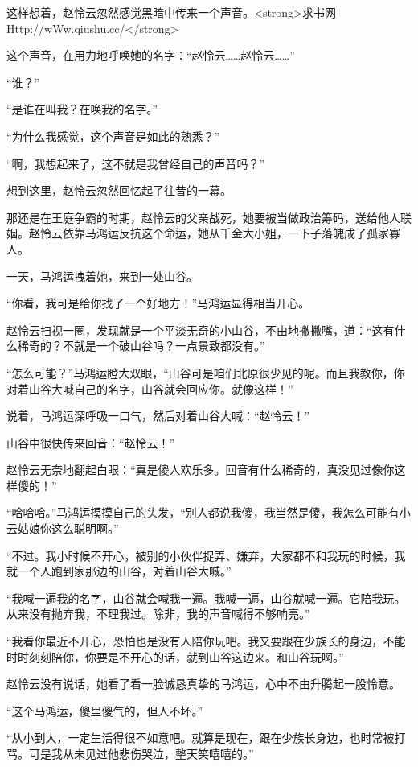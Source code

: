 
\begin{this_body}

这样想着，赵怜云忽然感觉黑暗中传来一个声音。<strong>求书网Http://wWw.qiushu.cc/</strong>

这个声音，在用力地呼唤她的名字：“赵怜云……赵怜云……”

“谁？”

“是谁在叫我？在唤我的名字。”

“为什么我感觉，这个声音是如此的熟悉？”

“啊，我想起来了，这不就是我曾经自己的声音吗？”

想到这里，赵怜云忽然回忆起了往昔的一幕。

那还是在王庭争霸的时期，赵怜云的父亲战死，她要被当做政治筹码，送给他人联姻。赵怜云依靠马鸿运反抗这个命运，她从千金大小姐，一下子落魄成了孤家寡人。

一天，马鸿运拽着她，来到一处山谷。

“你看，我可是给你找了一个好地方！”马鸿运显得相当开心。

赵怜云扫视一圈，发现就是一个平淡无奇的小山谷，不由地撇撇嘴，道：“这有什么稀奇的？不就是一个破山谷吗？一点景致都没有。”

“怎么可能？”马鸿运瞪大双眼，“山谷可是咱们北原很少见的呢。而且我教你，你对着山谷大喊自己的名字，山谷就会回应你。就像这样！”

说着，马鸿运深呼吸一口气，然后对着山谷大喊：“赵怜云！”

山谷中很快传来回音：“赵怜云！”

赵怜云无奈地翻起白眼：“真是傻人欢乐多。回音有什么稀奇的，真没见过像你这样傻的！”

“哈哈哈。”马鸿运摸摸自己的头发，“别人都说我傻，我当然是傻，我怎么可能有小云姑娘你这么聪明啊。”

“不过。我小时候不开心，被别的小伙伴捉弄、嫌弃，大家都不和我玩的时候，我就一个人跑到家那边的山谷，对着山谷大喊。”

“我喊一遍我的名字，山谷就会喊我一遍。我喊一遍，山谷就喊一遍。它陪我玩。从来没有抛弃我，不理我过。除非，我的声音喊得不够响亮。”

“我看你最近不开心，恐怕也是没有人陪你玩吧。我又要跟在少族长的身边，不能时时刻刻陪你，你要是不开心的话，就到山谷这边来。和山谷玩啊。”

赵怜云没有说话，她看了看一脸诚恳真挚的马鸿运，心中不由升腾起一股怜意。

“这个马鸿运，傻里傻气的，但人不坏。”

“从小到大，一定生活得很不如意吧。就算是现在，跟在少族长身边，也时常被打骂。可是我从未见过他悲伤哭泣，整天笑嘻嘻的。”


\end{this_body}
